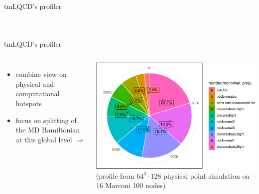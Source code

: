 \documentclass[xcolor={dvipsnames,table}]{beamer}
\begin{document}
\begin{frame}[fragile]{tmLQCD's profiler}
\begin{columns}
{       
      }
  \end{columns}
\end{frame}

\begin{frame}{tmLQCD's profiler}
  \begin{columns}
      \begin{itemize}
        \item combine view on physical and computational hotspots
        \vspace{0.2cm}
        \item focus on splitting of the MD Hamiltonian at this global level $\Rightarrow$
        \vspace{0.2cm}
      \end{itemize}
      \includegraphics[width=\textwidth]{hotspots_by_monomial}\\
      \footnotesize (profile from $64^3 \cdot 128$ physical point simulation on 16 Marconi 100 nodes)
  \end{columns}
\end{frame}
\end{document}
